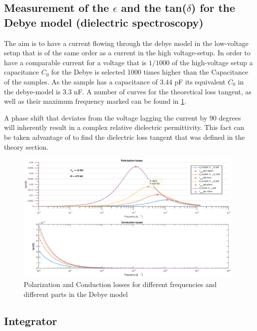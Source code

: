 \subsection{Measurement of the $\epsilon$ and the tan($\delta$) for the Debye model (dielectric spectroscopy)}

The aim is to have a current flowing through the debye model in the low-voltage setup that is of the same order as a current in the high voltage-setup. In order to have a comparable current for a voltage that is $1/1000$ of the high-voltage setup a capacitance $C_0$ for the Debye is selected 1000 times higher than the Capacitance of the samples. As the sample has a capacitance of 3.44 pF its equivalent $C_0$ in the debye-model is 3.3 nF.
A number of curves for the theoretical loss tangent, as well as their maximum frequency marked can be found in \ref{fig.debye-modell}.


A phase shift that deviates from the voltage lagging the current by 90 degrees will inherently result in a complex relative dielectric permittivity. This fact can be
taken advantage of to find the dielectric loss tangent that was defined in the theory section.
\begin{figure}
\includegraphics[width=0.99\textwidth]{figures/Method/Dielectric_loss/polarizationmultiple.eps}
    \caption{Polarization and Conduction losses for different frequencies and different parts in the Debye model}
    \label{fig.debye-modell}
   \end{figure}	


\subsection{Integrator}
